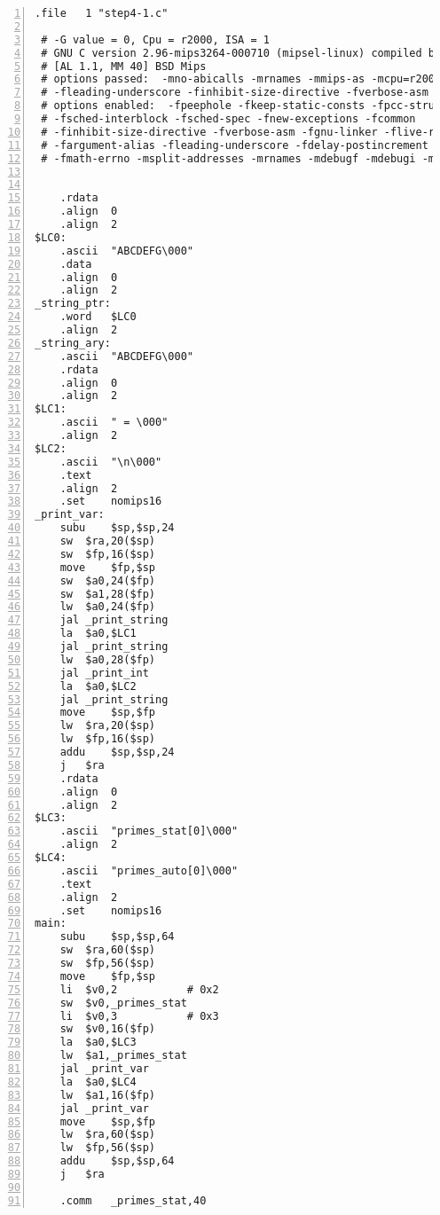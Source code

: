 \documentclass[11pt]{jarticle}
\begin{document}
\begin{lstlisting}[caption=report2-1.s,label=report2-1c,numbers=left]
	.file	1 "step4-1.c"

 # -G value = 0, Cpu = r2000, ISA = 1
 # GNU C version 2.96-mips3264-000710 (mipsel-linux) compiled by GNU C version 2.96 20000731 (Red Hat Linux 7.2 2.96-112.7.2).
 # [AL 1.1, MM 40] BSD Mips
 # options passed:  -mno-abicalls -mrnames -mmips-as -mcpu=r2000 -O0
 # -fleading-underscore -finhibit-size-directive -fverbose-asm
 # options enabled:  -fpeephole -fkeep-static-consts -fpcc-struct-return
 # -fsched-interblock -fsched-spec -fnew-exceptions -fcommon
 # -finhibit-size-directive -fverbose-asm -fgnu-linker -flive-range-gdb
 # -fargument-alias -fleading-underscore -fdelay-postincrement -fident
 # -fmath-errno -msplit-addresses -mrnames -mdebugf -mdebugi -mcpu=r2000


	.rdata
	.align	0
	.align	2
$LC0:
	.ascii	"ABCDEFG\000"
	.data
	.align	0
	.align	2
_string_ptr:
	.word	$LC0
	.align	2
_string_ary:
	.ascii	"ABCDEFG\000"
	.rdata
	.align	0
	.align	2
$LC1:
	.ascii	" = \000"
	.align	2
$LC2:
	.ascii	"\n\000"
	.text
	.align	2
	.set	nomips16
_print_var:
	subu	$sp,$sp,24
	sw	$ra,20($sp)
	sw	$fp,16($sp)
	move	$fp,$sp
	sw	$a0,24($fp)
	sw	$a1,28($fp)
	lw	$a0,24($fp)
	jal	_print_string
	la	$a0,$LC1
	jal	_print_string
	lw	$a0,28($fp)
	jal	_print_int
	la	$a0,$LC2
	jal	_print_string
	move	$sp,$fp
	lw	$ra,20($sp)
	lw	$fp,16($sp)
	addu	$sp,$sp,24
	j	$ra
	.rdata
	.align	0
	.align	2
$LC3:
	.ascii	"primes_stat[0]\000"
	.align	2
$LC4:
	.ascii	"primes_auto[0]\000"
	.text
	.align	2
	.set	nomips16
main:
	subu	$sp,$sp,64
	sw	$ra,60($sp)
	sw	$fp,56($sp)
	move	$fp,$sp
	li	$v0,2			# 0x2
	sw	$v0,_primes_stat
	li	$v0,3			# 0x3
	sw	$v0,16($fp)
	la	$a0,$LC3
	lw	$a1,_primes_stat
	jal	_print_var
	la	$a0,$LC4
	lw	$a1,16($fp)
	jal	_print_var
	move	$sp,$fp
	lw	$ra,60($sp)
	lw	$fp,56($sp)
	addu	$sp,$sp,64
	j	$ra

	.comm	_primes_stat,40
\end{lstlisting}
\end{document}
